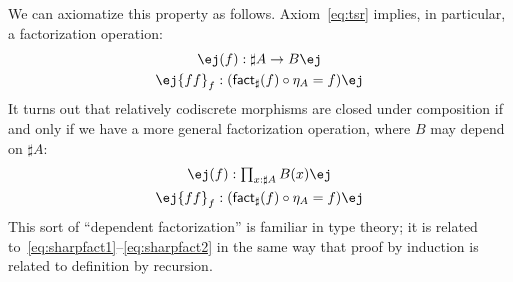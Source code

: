 \documentclass[copyright]{eptcs}
\makeatletter
\newcommand{\factsharp}{\textsf{fact}_{\sharp}}
\def\jd#1{\@jd#1\ej}
\def\@jd#1|-#2\ej{\@@jd#1,,\;\vdash\;\left(#2\right)}
\def\@@jd#1,{\@ifmtarg{#1}{\let\next=\relax}{\left(#1\right)\let\next=\@@@jd}\next}
\def\@@@jd#1,{\@ifmtarg{#1}{\let\next=\relax}{,\,\left(#1\right)\let\next=\@@@jd}\next}
\makeatother
\begin{document}
We can axiomatize this property as follows.
Axiom~\eqref{eq:tsr} implies, in particular, a factorization operation:
\begin{gather}
  \jd{\mathsf{bc}:\mathsf{isCodisc}(B), f:A\to B |- \factsharp(f):\sharp A \to B} \label{eq:sharpfact1} \\
  \jd{\mathsf{bc}:\mathsf{isCodisc}(B), f:A\to B |- \mathsf{ff}_f:(\factsharp(f) \circ \eta_A = f)}\label{eq:sharpfact2}
\end{gather}
It turns out that relatively codiscrete morphisms are closed under composition if and only if we have a more general factorization operation, where $B$ may depend on $\sharp A$:
\begin{gather}
  \jd{ \mathsf{bc}:\textstyle\prod_{x:\sharp A}\mathsf{isCodisc}(B(x)),
    f:\textstyle\prod_{x:A} B(\eta_A(x))
    |- \factsharp(f):\textstyle\prod_{x:\sharp A} B(x)} \\
  \jd{ \mathsf{bc}:\textstyle\prod_{x:\sharp A}\mathsf{isCodisc}(B(x)),
    f:\textstyle\prod_{x:A} B(\eta_A(x))
    |- \mathsf{ff}_f: (\factsharp(f) \circ \eta_A = f)}
\end{gather}
This sort of ``dependent factorization'' is familiar in type theory;
it is related to~\eqref{eq:sharpfact1}--\eqref{eq:sharpfact2} in the same way that proof by induction is related to definition by recursion.
\end{document}
